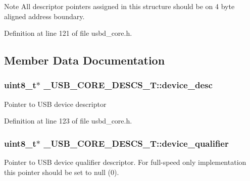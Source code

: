 \begin{DoxyNote}{Note}
All descriptor pointers assigned in this structure should be on 4 byte aligned address boundary. 
\end{DoxyNote}


Definition at line 121 of file usbd\+\_\+core.\+h.



\subsection{Member Data Documentation}
\subsubsection[{\texorpdfstring{device\+\_\+desc}{device_desc}}]{\setlength{\rightskip}{0pt plus 5cm}uint8\+\_\+t$\ast$ \+\_\+\+U\+S\+B\+\_\+\+C\+O\+R\+E\+\_\+\+D\+E\+S\+C\+S\+\_\+\+T\+::device\+\_\+desc}\hypertarget{struct__USB__CORE__DESCS__T_a15c6d25f9b77c7034439715d769f20f3}{}\label{struct__USB__CORE__DESCS__T_a15c6d25f9b77c7034439715d769f20f3}
Pointer to U\+SB device descriptor 

Definition at line 123 of file usbd\+\_\+core.\+h.

\subsubsection[{\texorpdfstring{device\+\_\+qualifier}{device_qualifier}}]{\setlength{\rightskip}{0pt plus 5cm}uint8\+\_\+t$\ast$ \+\_\+\+U\+S\+B\+\_\+\+C\+O\+R\+E\+\_\+\+D\+E\+S\+C\+S\+\_\+\+T\+::device\+\_\+qualifier}\hypertarget{struct__USB__CORE__DESCS__T_aec1cd64157ed8c38c31b561f6857e6cf}{}\label{struct__USB__CORE__DESCS__T_aec1cd64157ed8c38c31b561f6857e6cf}
Pointer to U\+SB device qualifier descriptor. For full-\/speed only implementation this pointer should be set to null (0). 

